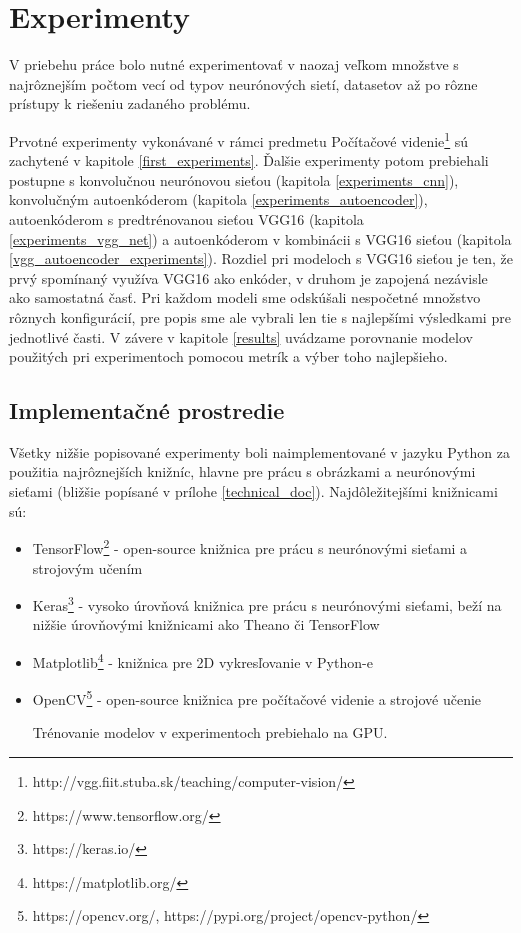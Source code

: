 
\newpage
\section{Experimenty}

\label{experiments}
V priebehu práce bolo nutné experimentovať v naozaj veľkom množstve s najrôznejším počtom vecí od typov neurónových sietí, datasetov až po rôzne prístupy k riešeniu zadaného problému.

Prvotné experimenty vykonávané v rámci predmetu Počítačové videnie\footnote{http://vgg.fiit.stuba.sk/teaching/computer-vision/} sú zachytené v kapitole \ref{first_experiments}. Ďalšie experimenty potom prebiehali postupne s konvolučnou neurónovou sieťou (kapitola \ref{experiments_cnn}), konvolučným autoenkóderom (kapitola \ref{experiments_autoencoder}), autoenkóderom s predtrénovanou sieťou VGG16 (kapitola \ref{experiments_vgg_net}) a autoenkóderom v kombinácii s VGG16 sieťou (kapitola \ref{vgg_autoencoder_experiments}). Rozdiel pri modeloch s VGG16 sieťou je ten, že prvý spomínaný využíva VGG16 ako enkóder, v druhom je zapojená nezávisle ako samostatná časť.  Pri každom modeli sme odskúšali nespočetné množstvo rôznych konfigurácií, pre popis sme ale vybrali len tie s najlepšími výsledkami pre jednotlivé časti. V závere v kapitole \ref{results} uvádzame porovnanie modelov použitých pri experimentoch pomocou metrík a výber toho najlepšieho. 

\subsection{Implementačné prostredie}

Všetky nižšie popisované experimenty boli naimplementované v jazyku Python za použitia najrôznejších knižníc, hlavne pre prácu s obrázkami a neurónovými sieťami (bližšie popísané v prílohe \ref{technical_doc}). Najdôležitejšími knižnicami sú:
\begin{itemize}
	\item TensorFlow\footnote{https://www.tensorflow.org/} - open-source knižnica pre prácu s neurónovými sieťami a strojovým učením
	\item Keras\footnote{https://keras.io/} - vysoko úrovňová knižnica pre prácu s neurónovými sieťami, beží na nižšie úrovňovými knižnicami ako Theano či TensorFlow
	\item Matplotlib\footnote{https://matplotlib.org/} - knižnica pre 2D vykresľovanie v Python-e
	\item OpenCV\footnote{https://opencv.org/, https://pypi.org/project/opencv-python/} - open-source knižnica pre počítačové videnie a strojové učenie
	
	Trénovanie modelov v experimentoch prebiehalo na GPU.
\end{itemize}

